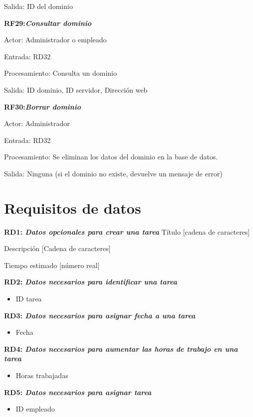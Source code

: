\documentclass[paper=a4, fontsize=11pt, spanish]{scrartcl}
\begin{document}
Salida: ID del dominio

\setlength{\parindent}{0em}
\textbf{RF29:\textit{Consultar dominio}}
\setlength{\parindent}{3em}

Actor: Administrador o empleado

Entrada: RD32

Procesamiento: Consulta un dominio

Salida: ID dominio, ID servidor, Dirección web

\setlength{\parindent}{0em}
\textbf{RF30:\textit{Borrar dominio}}
\setlength{\parindent}{3em}

Actor: Administrador

Entrada: RD32

Procesamiento: Se eliminan los datos del dominio en la base de datos.

Salida: Ninguna  (si el dominio no existe, devuelve un mensaje de error)

\section{Requisitos de datos}
\setlength{\parindent}{0em}
\textbf{RD1: \textit{Datos opcionales para crear una tarea}}
\setlength{\parindent}{2em}
Título [cadena de caracteres]

Descripción [Cadena de caracteres]

Tiempo estimado [número real]

\setlength{\parindent}{0em}
\textbf{RD2: \textit{Datos necesarios para identificar una tarea}}
\setlength{\parindent}{2em}
\begin{itemize}
\item ID tarea
\end{itemize}

\setlength{\parindent}{0em}
\textbf{RD3: \textit{Datos necesarios para asignar fecha a una tarea}}
\setlength{\parindent}{2em}
\begin{itemize}
\item Fecha
\end{itemize}

\setlength{\parindent}{0em}
\textbf{RD4: \textit{Datos necesarios para aumentar las horas de trabajo en una tarea}}
\setlength{\parindent}{2em}
\begin{itemize}
\item Horas trabajadas
\end{itemize}

\setlength{\parindent}{0em}
\textbf{RD5: \textit{Datos necesarios para asignar tarea}}
\setlength{\parindent}{2em}
\begin{itemize}
\item ID empleado
\end{itemize}
\end{document}
